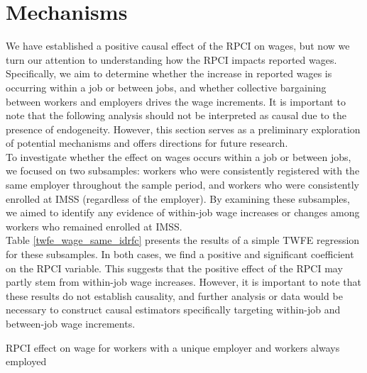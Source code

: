 \documentclass[10pt, oneside]{book}
\begin{document}
\normalsize

\section{Mechanisms}

We have established a positive causal effect of the RPCI on wages, but now we turn our attention to understanding how the RPCI impacts reported wages. Specifically, we aim to determine whether the increase in reported wages is occurring within a job or between jobs, and whether collective bargaining between workers and employers drives the wage increments. It is important to note that the following analysis should not be interpreted as causal due to the presence of endogeneity. However, this section serves as a preliminary exploration of potential mechanisms and offers directions for future research. \\

To investigate whether the effect on wages occurs within a job or between jobs, we focused on two subsamples: workers who were consistently registered with the same employer throughout the sample period, and workers who were consistently enrolled at IMSS (regardless of the employer). By examining these subsamples, we aimed to identify any evidence of within-job wage increases or changes among workers who remained enrolled at IMSS. \\

Table \ref{twfe_wage_same_idrfc} presents the results of a simple TWFE regression for these subsamples. In both cases, we find a positive and significant coefficient on the RPCI variable. This suggests that the positive effect of the RPCI may partly stem from within-job wage increases. However, it is important to note that these results do not establish causality, and further analysis or data would be necessary to construct causal estimators specifically targeting within-job and between-job wage increments. \\

\begin{table}[H]
    \caption{RPCI effect on wage for workers with a unique employer and workers always employed}
    \label{twfe_wage_same_idrfc}
    \begin{center}
    \scriptsize{}
    \end{center}
\end{table}
\end{document}

